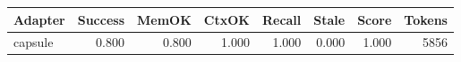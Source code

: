 \begin{tabular}{lrrrrrrr}
\hline
Adapter & Success & MemOK & CtxOK & Recall & Stale & Score & Tokens \\
\hline
capsule & 0.800 & 0.800 & 1.000 & 1.000 & 0.000 & 1.000 & 5856 \\
\hline
\end{tabular}
